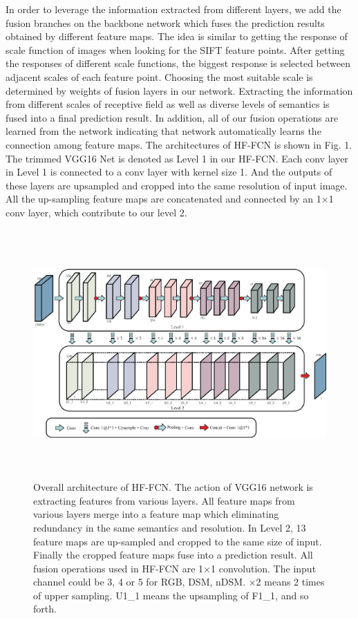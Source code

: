 \setlength{\parindent}{2ex}In order to leverage the information extracted from different layers, we add the fusion branches on the backbone network which fuses the prediction results obtained by different feature maps. The idea is similar to getting the response of scale function of images when looking for the SIFT feature points. After getting the responses of different scale functions, the biggest response is selected between adjacent scales of each feature point. Choosing the most suitable scale is determined by weights of fusion layers in our network. Extracting the information from different scales of receptive field as well as diverse levels of semantics is fused into a final prediction result. In addition, all of our fusion operations are learned from the network indicating that network automatically learns the connection among feature maps. The architectures of HF-FCN is shown in Fig. 1. The trimmed VGG16 Net is denoted as Level 1 in our HF-FCN. Each conv layer in Level 1 is connected to a conv layer with kernel size 1. And the outputs of these layers are upsampled and cropped into the same resolution of input image. All the up-sampling feature maps are concatenated and connected  by an 1$\times$1 conv layer, which contribute to our level 2.\par
\begin{figure}
\centering
\includegraphics[width=18cm,height=9.5cm]{Figures/network_architecture.eps}
\centering
\caption{Overall architecture of HF-FCN. The action of VGG16 network is extracting features from various layers. All feature maps from various layers merge into a feature map which eliminating redundancy in the same semantics and resolution. In Level 2, 13 feature maps are up-sampled and cropped to the same size of input. Finally the cropped feature maps fuse into a prediction result. All fusion operations used in HF-FCN are 1$\times$1 convolution. The input channel could be 3, 4 or 5 for RGB, DSM, nDSM. $\times$2 means 2 times of upper sampling. U1\_1 means the upsampling of F1\_1, and so forth.  }
\label{3}
\end{figure}
